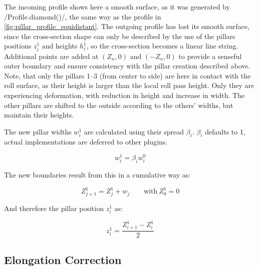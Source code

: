 \documentclass[11pt]{PyRollDocs}
\begin{document}
    The incoming profile shows here a smooth surface, as it was generated by \py/Profile.diamond()/, the same way as the profile in \autoref{fig:pillar_profile_equidistant}.
    The outgoing profile has lost its smooth surface, since the cross-section shape can only be described by the use of the pillars positions $z_i^1$ and heights $h_i^1$, so the cross-section becomes a linear line string.
    Additional points are added at $(Z_n, 0)$ and $(-Z_n, 0)$ to provide a senseful outer boundary and ensure consistency with the pillar creation described above.
    Note, that only the pillars 1--3 (from center to side) are here in contact with the roll surface, as their height is larger than the local roll pass height.
    Only they are experiencing deformation, with reduction in height and increase in width.
    The other pillars are shifted to the outside according to the others' widths, but maintain their heights.

    The new pillar widths $w_i^1$ are calculated using their spread $\beta_i$. $\beta_i$ defaults to \num{1}, actual implementations are deferred to other plugins.

    \begin{equation}
        w_i^1 = \beta_i w_i^0
        \label{eq:spread}
    \end{equation}

    The new boundaries result from this in a cumulative way as:

    \begin{equation}
        Z_{j+1}^1 = Z_j^1 + w_j \qquad \text{with}\ Z_0^1 = 0
        \label{eq:boundaries1}
    \end{equation}

    And therefore the pillar position $z_i^1$ as:

    \begin{equation}
        z_i^1 = \frac{Z^1_{i+1} - Z^1_i}{2}
        \label{eq:pillars1}
    \end{equation}

    \subsection{Elongation Correction}\label{subsec:elongation-correction}
\end{document}
